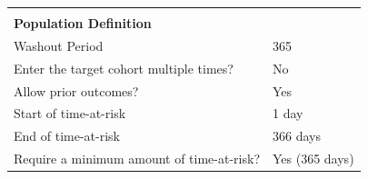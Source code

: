 \documentclass[]{article}
\begin{document}
\begin{longtable}[]{@{}ll@{}}
\begin{minipage}[t]{0.51\columnwidth}
\end{minipage}\tabularnewline
\begin{minipage}[t]{0.42\columnwidth}\raggedright\strut
\textbf{Population Definition}\strut
\end{minipage} & \begin{minipage}[t]{0.51\columnwidth}\raggedright\strut
\strut
\end{minipage}\tabularnewline
\begin{minipage}[t]{0.42\columnwidth}\raggedright\strut
Washout Period\strut
\end{minipage} & \begin{minipage}[t]{0.51\columnwidth}\raggedright\strut
365\strut
\end{minipage}\tabularnewline
\begin{minipage}[t]{0.42\columnwidth}\raggedright\strut
Enter the target cohort multiple times?\strut
\end{minipage} & \begin{minipage}[t]{0.51\columnwidth}\raggedright\strut
No\strut
\end{minipage}\tabularnewline
\begin{minipage}[t]{0.42\columnwidth}\raggedright\strut
Allow prior outcomes?\strut
\end{minipage} & \begin{minipage}[t]{0.51\columnwidth}\raggedright\strut
Yes\strut
\end{minipage}\tabularnewline
\begin{minipage}[t]{0.42\columnwidth}\raggedright\strut
Start of time-at-risk\strut
\end{minipage} & \begin{minipage}[t]{0.51\columnwidth}\raggedright\strut
1 day\strut
\end{minipage}\tabularnewline
\begin{minipage}[t]{0.42\columnwidth}\raggedright\strut
End of time-at-risk\strut
\end{minipage} & \begin{minipage}[t]{0.51\columnwidth}\raggedright\strut
366 days\strut
\end{minipage}\tabularnewline
\begin{minipage}[t]{0.42\columnwidth}\raggedright\strut
Require a minimum amount of time-at-risk?\strut
\end{minipage} & \begin{minipage}[t]{0.51\columnwidth}\raggedright\strut
Yes (365 days)\strut
\end{minipage}\tabularnewline

\end{longtable}
\end{document}
